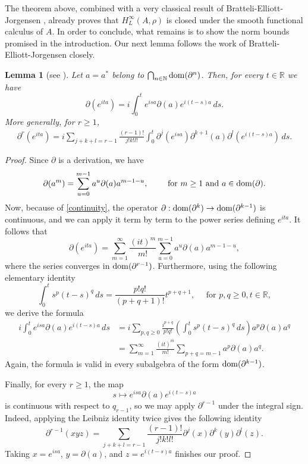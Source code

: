\documentclass[11pt]{article}
\newtheorem{lem}[thm]{Lemma}
\theoremstyle{definition}
\theoremstyle{remark}
\numberwithin{equation}{section}
\numberwithin{equation}{section}
\def\R{\mathbb{R}}
\numberwithin{equation}{section}
\begin{document}
The theorem above, combined with a very classical result of Bratteli-Elliott-Jorgensen \cite[Lemma 3.2]{BaElJo84}, already proves that $H^\infty_L(A,\rho)$ is closed under the smooth functional calculus of $A$. In order to conclude, what remains is to show the norm bounds promised in the introduction. Our next lemma follows the work of Bratteli-Elliott-Jorgensen closely.


\begin{lem}[see {{\cite[Lemma 3.2]{BaElJo84}}}]\label{derivationsss}
Let $a=a^*$ belong to $\bigcap_{n\in\mathbb N}{\rm dom}(\partial^n)$. Then, for every $t\in\mathbb R$ we have
\begin{equation*}
 \partial(e^{ita})=i\int_0^t e^{isa}\partial(a)e^{i(t-s)a}\,ds.
\end{equation*}
More generally, for $r\geq1$,
\begin{align*}
 \partial^r(e^{ita})=i\sum_{j+k+l=r-1}\frac{(r-1)!}{j!k!l!}\int_0^t\partial^j(e^{isa})\partial^{k+1}(a)\partial^l(e^{i(t-s)a})\,ds.
\end{align*}
\end{lem}

\begin{proof}
Since $\partial$ is a derivation, we have 
$$
\partial(a^m)=\sum_{u=0}^{m-1}a^u\partial(a)a^{m-1-u}, \qquad\text{ for } m\geq1 \text{ and }a\in{\rm dom}(\partial).
$$
Now, because of \eqref{continuity}, the operator $\partial:{\rm dom}(\partial^k)\to{\rm dom}(\partial^{k-1})$ is continuous, and we can apply it term by term to the power series defining $e^{ita}$. It follows that
\begin{equation*}
 \partial(e^{ita})=\sum_{m=1}^\infty\frac{(it)^m}{m!}\sum_{u=0}^{m-1}a^u\partial(a)a^{m-1-u},
 \end{equation*}
where the series converges in ${\rm dom}(\partial^{r-1})$. Furthermore, using the following elementary identity
\begin{equation*}
 \int_0^t s^p(t-s)^q\,ds=\frac{p!q!}{(p+q+1)!}t^{p+q+1}, \quad \text{ for }p,q\geq0, t\in\R,
\end{equation*}
we derive the formula
\begin{align*}
 i\int_0^t e^{isa}\partial(a)e^{i(t-s)a}\,ds&=i\sum_{p,q\geq0}\frac{i^{p+q}}{p!q!}\left(\int_0^t s^p(t-s)^q\,ds\right)a^p\partial(a)a^q\\
 &=\sum_{m=1}^\infty\frac{(it)^m}{m!}\sum_{p+q=m-1}a^p\partial(a)a^q.
\end{align*}
Again, the formula is valid in every subalgebra of the form ${\rm dom}(\partial^{k-1})$.

Finally, for every $r\geq1$,  the map
\[
 s\longmapsto e^{isa}\partial(a)e^{i(t-s)a}
\]
is continuous with respect to $q_{r-1}$, so we may apply $\partial^{r-1}$ under the integral sign. Indeed, applying the Leibniz identity twice gives the following identity
\[
 \partial^{r-1}(xyz)
 =\sum_{j+k+l=r-1}\frac{(r-1)!}{j!k!l!}
   \partial^j(x)\partial^k(y)\partial^l(z).
\]
Taking $x=e^{isa}$, $y=\partial(a)$, and $z=e^{i(t-s)a}$ finishes our proof.
\end{proof}
\end{document}
